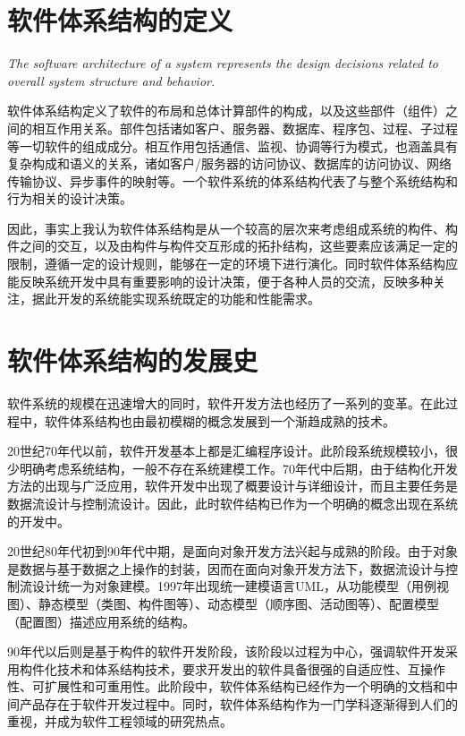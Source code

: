 \documentclass{SCIS2023cn}
\begin{document}
\maketitle

\section{软件体系结构的定义}

\textit{The software architecture of a system represents the design decisions related to overall system structure and behavior.}


软件体系结构定义了软件的布局和总体计算部件的构成，以及这些部件（组件）之间的相互作用关系。部件包括诸如客户、服务器、数据库、程序包、过程、子过程等一切软件的组成成分。相互作用包括通信、监视、协调等行为模式，也涵盖具有复杂构成和语义的关系，诸如客户/服务器的访问协议、数据库的访问协议、网络传输协议、异步事件的映射等。一个软件系统的体系结构代表了与整个系统结构和行为相关的设计决策。

因此，事实上我认为软件体系结构是从一个较高的层次来考虑组成系统的构件、构件之间的交互，以及由构件与构件交互形成的拓扑结构，这些要素应该满足一定的限制，遵循一定的设计规则，能够在一定的环境下进行演化。同时软件体系结构应能反映系统开发中具有重要影响的设计决策，便于各种人员的交流，反映多种关注，据此开发的系统能实现系统既定的功能和性能需求。

\section{软件体系结构的发展史}

软件系统的规模在迅速增大的同时，软件开发方法也经历了一系列的变革。在此过程中，软件体系结构也由最初模糊的概念发展到一个渐趋成熟的技术。

20世纪70年代以前，软件开发基本上都是汇编程序设计。此阶段系统规模较小，很少明确考虑系统结构，一般不存在系统建模工作。70年代中后期，由于结构化开发方法的出现与广泛应用，软件开发中出现了概要设计与详细设计，而且主要任务是数据流设计与控制流设计。因此，此时软件结构已作为一个明确的概念出现在系统的开发中。

20世纪80年代初到90年代中期，是面向对象开发方法兴起与成熟的阶段。由于对象是数据与基于数据之上操作的封装，因而在面向对象开发方法下，数据流设计与控制流设计统一为对象建模。1997年出现统一建模语言UML，从功能模型（用例视图）、静态模型（类图、构件图等）、动态模型（顺序图、活动图等）、配置模型（配置图）描述应用系统的结构。

90年代以后则是基于构件的软件开发阶段，该阶段以过程为中心，强调软件开发采用构件化技术和体系结构技术，要求开发出的软件具备很强的自适应性、互操作性、可扩展性和可重用性。此阶段中，软件体系结构已经作为一个明确的文档和中间产品存在于软件开发过程中。同时，软件体系结构作为一门学科逐渐得到人们的重视，并成为软件工程领域的研究热点。
\end{document}
